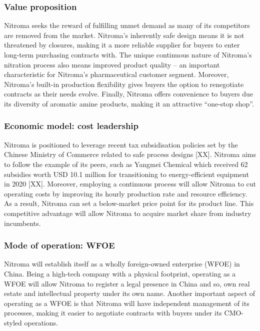 \subsubsection{Value proposition}
Nitroma seeks the reward of fulfilling unmet demand as many of its competitors are removed from the market. Nitroma’s inherently safe design means it is not threatened by closures, making it a more reliable supplier for buyers to enter long-term purchasing contracts with. The unique continuous nature of Nitroma’s nitration process also means improved product quality – an important characteristic for Nitroma’s pharmaceutical customer segment. Moreover, Nitroma’s built-in production flexibility gives buyers the option to renegotiate contracts as their needs evolve. Finally, Nitroma offers convenience to buyers due its diversity of aromatic amine products, making it an attractive “one-stop shop”.
\subsubsection{Economic model: cost leadership}
Nitroma is positioned to leverage recent tax subsidisation policies set by the Chinese Ministry of Commerce related to safe process designs [XX]. Nitroma aims to follow the example of its peers, such as Yangmei Chemical which received 62 subsidies worth USD 10.1 million for transitioning to energy-efficient equipment in 2020 [XX]. Moreover, employing a continuous process will allow Nitroma to cut operating costs by improving its hourly production rate and resource efficiency. As a result, Nitroma can set a below-market price point for its product line. This competitive advantage will allow Nitroma to acquire market share from industry incumbents. 
\subsubsection{Mode of operation: WFOE}
Nitroma will establish itself as a wholly foreign-owned enterprise (WFOE) in China. Being a high-tech company with a physical footprint, operating as a WFOE will allow Nitroma to register a legal presence in China and so, own real estate and intellectual property under its own name. Another important aspect of operating as a WFOE is that Nitroma will have independent management of its processes, making it easier to negotiate contracts with buyers under its CMO-styled operations.

